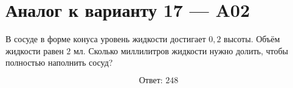 \documentclass[12pt,a4paper]{article}
\begin{document}
\section*{Аналог к варианту 17 — A02}

В сосуде в форме конуса уровень жидкости достигает \(0{,}2\) высоты. Объём жидкости равен \(2\) мл. Сколько миллилитров жидкости нужно долить, чтобы полностью наполнить сосуд?

\begin{center}
\end{center}

\[
\boxed{\text{Ответ: }248}
\]
\end{document}

